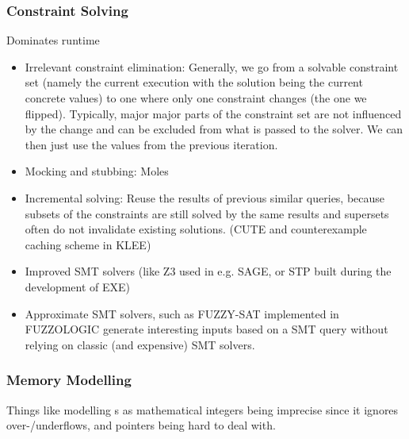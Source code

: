 \documentclass{article}
\begin{document}
\subsubsection{Constraint Solving}
Dominates runtime
\begin{itemize}
    \item Irrelevant constraint elimination: Generally, we go from a solvable constraint set (namely the current execution with the solution being the current concrete values) to one where only one constraint changes (the one we flipped). Typically, major major parts of the constraint set are not influenced by the change and can be excluded from what is passed to the solver. We can then just use the values from the previous iteration.
    \item Mocking and stubbing: Moles\cite{Moles}
    \item Incremental solving: Reuse the results of previous similar queries, because subsets of the constraints are still solved by the same results and supersets often do not invalidate existing solutions. (CUTE\cite{CUTE} and counterexample caching scheme in KLEE\cite{KLEE})
    \item Improved SMT solvers (like Z3\cite{Z3} used in e.g. SAGE\cite{SAGE}, or STP\cite{STP} built during the development of EXE\cite{EXE})
    \item Approximate SMT solvers, such as FUZZY-SAT implemented in FUZZOLOGIC\cite{FUZZOLIC} generate interesting inputs based on a SMT query without relying on classic (and expensive) SMT solvers.
\end{itemize}

\subsubsection{Memory Modelling}
Things like modelling s as mathematical integers being imprecise since it ignores over-/underflows, and pointers being hard to deal with. \cite{ReviewThreeDecades}
\end{document}
